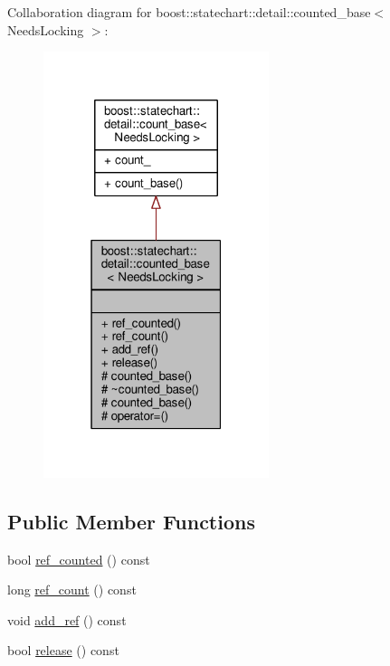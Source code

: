 Collaboration diagram for boost\+:\+:statechart\+:\+:detail\+:\+:counted\+\_\+base$<$ Needs\+Locking $>$\+:
\nopagebreak
\begin{figure}[H]
\begin{center}
\leavevmode
\includegraphics[width=187pt]{classboost_1_1statechart_1_1detail_1_1counted__base__coll__graph}
\end{center}
\end{figure}
\subsection*{Public Member Functions}
\begin{DoxyCompactItemize}
\item 
bool \mbox{\hyperlink{classboost_1_1statechart_1_1detail_1_1counted__base_aa404549b8d8ed82d1fb8ae738a8592c6}{ref\+\_\+counted}} () const
\item 
long \mbox{\hyperlink{classboost_1_1statechart_1_1detail_1_1counted__base_ab278d2aba3d8362be9509890ebf1a5db}{ref\+\_\+count}} () const
\item 
void \mbox{\hyperlink{classboost_1_1statechart_1_1detail_1_1counted__base_aefaa0b61dac7d928ed816db1e74c7c16}{add\+\_\+ref}} () const
\item 
bool \mbox{\hyperlink{classboost_1_1statechart_1_1detail_1_1counted__base_a29f73a500a617f248e0388670985493d}{release}} () const
\end{DoxyCompactItemize}
